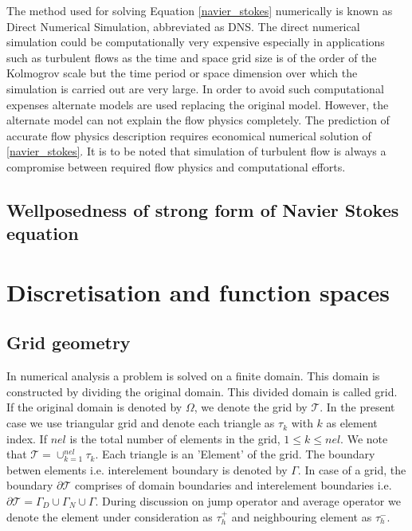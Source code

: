 \documentclass[a4paper,12pt]{book}
\begin{document}
The method used for solving Equation \eqref{navier_stokes} numerically is known as Direct Numerical Simulation, abbreviated as DNS. The direct numerical simulation could be computationally very expensive especially in applications such as turbulent flows as the time and space grid size is of the order of the Kolmogrov scale but the time period or space dimension over which the simulation is carried out are very large. In order to avoid such computational expenses alternate models are used replacing the original model. However, the alternate model can not explain the flow physics completely. The prediction of accurate flow physics description requires economical numerical solution of \eqref{navier_stokes}. It is to be noted that simulation of turbulent flow is always a compromise between required flow physics and computational efforts.

\section[Wellposedness]{Wellposedness of strong form of Navier Stokes equation}

\chapter{Discretisation and function spaces}
\section{Grid geometry}

In numerical analysis a problem is solved on a finite domain. This domain is constructed by dividing the original domain. This divided domain is called grid. If the original domain is denoted by $\Omega$, we denote the grid by $\mathcal{T}$. In the present case we use triangular grid and denote each triangle as $\tau_k$ with $k$ as element index. If $nel$ is the total number of elements in the grid, $1\leq k \leq nel$. We note that $\mathcal{T} = \cup_{k=1}^{nel} \tau_k$. Each triangle is an 'Element' of the grid. The boundary betwen elements i.e. interelement boundary is denoted by $\Gamma$. In case of a grid, the boundary $\partial \mathcal{T}$ comprises of domain boundaries and interelement boundaries i.e. $\partial \mathcal{T} = \Gamma_D \cup \Gamma_N \cup \Gamma$. During discussion on jump operator and average operator we denote the element under consideration as $\tau_{h}^+$ and neighbouring element as $\tau_{h}^-$. 
\end{document}
